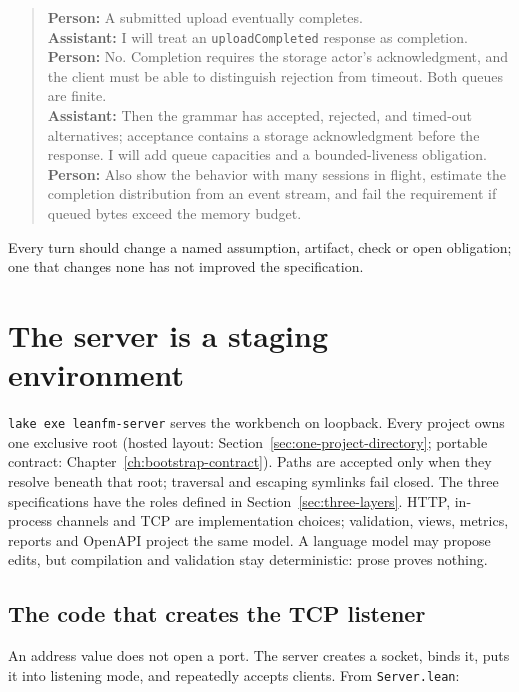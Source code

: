 \begin{quote}\small
\textbf{Person:} A submitted upload eventually completes.\\
\textbf{Assistant:} I will treat an \texttt{uploadCompleted} response as
completion.\\
\textbf{Person:} No. Completion requires the storage actor's acknowledgment,
and the client must be able to distinguish rejection from timeout. Both queues
are finite.\\
\textbf{Assistant:} Then the grammar has accepted, rejected, and timed-out
alternatives; acceptance contains a storage acknowledgment before the response.
I will add queue capacities and a bounded-liveness obligation.\\
\textbf{Person:} Also show the behavior with many sessions in flight, estimate
the completion distribution from an event stream, and fail the requirement if
queued bytes exceed the memory budget.
\end{quote}

Every turn should change a named assumption, artifact, check or open obligation;
one that changes none has not improved the specification.

\section{The server is a staging environment}

\texttt{lake exe leanfm-server} serves the workbench on loopback. Every project
owns one exclusive root (hosted layout: Section~\ref{sec:one-project-directory};
portable contract: Chapter~\ref{ch:bootstrap-contract}). Paths are accepted only
when they resolve beneath that root; traversal and escaping symlinks fail closed.
The three specifications have the roles defined in Section~\ref{sec:three-layers}.
HTTP, in-process channels and TCP are implementation choices; validation, views,
metrics, reports and OpenAPI project the same model. A language model may propose
edits, but compilation and validation stay deterministic: prose proves nothing.

\subsection{The code that creates the TCP listener}

An address value does not open a port. The server creates a socket, binds it,
puts it into listening mode, and repeatedly accepts clients. From
\texttt{Server.lean}:

